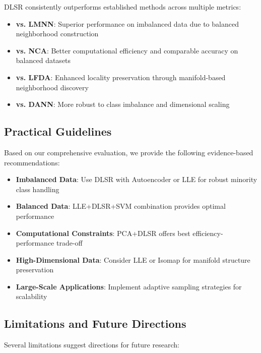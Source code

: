 \documentclass[review]{elsarticle}
\begin{document}
DLSR consistently outperforms established methods across multiple metrics:

\begin{itemize}
\item \textbf{vs. LMNN}: Superior performance on imbalanced data due to balanced neighborhood construction
\item \textbf{vs. NCA}: Better computational efficiency and comparable accuracy on balanced datasets
\item \textbf{vs. LFDA}: Enhanced locality preservation through manifold-based neighborhood discovery
\item \textbf{vs. DANN}: More robust to class imbalance and dimensional scaling
\end{itemize}

\subsection{Practical Guidelines}

Based on our comprehensive evaluation, we provide the following evidence-based recommendations:

\begin{itemize}
\item \textbf{Imbalanced Data}: Use DLSR with Autoencoder or LLE for robust minority class handling
\item \textbf{Balanced Data}: LLE+DLSR+SVM combination provides optimal performance
\item \textbf{Computational Constraints}: PCA+DLSR offers best efficiency-performance trade-off  
\item \textbf{High-Dimensional Data}: Consider LLE or Isomap for manifold structure preservation
\item \textbf{Large-Scale Applications}: Implement adaptive sampling strategies for scalability
\end{itemize}

\subsection{Limitations and Future Directions}

Several limitations suggest directions for future research:
\end{document}
